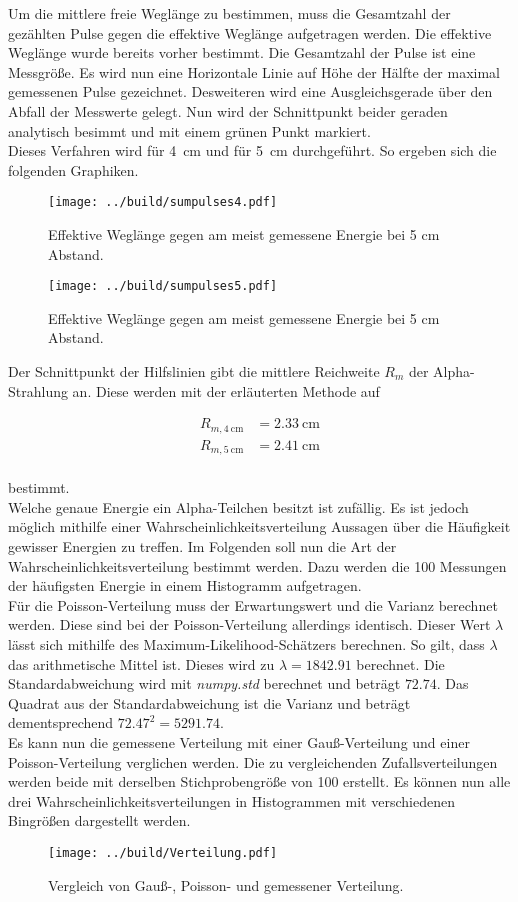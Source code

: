 Um die mittlere freie Weglänge zu bestimmen, muss die Gesamtzahl der gezählten Pulse gegen die effektive Weglänge aufgetragen werden. 
Die effektive Weglänge wurde bereits vorher bestimmt. Die Gesamtzahl der Pulse ist eine Messgröße. 
Es wird nun eine Horizontale Linie auf Höhe der Hälfte der maximal gemessenen Pulse gezeichnet. Desweiteren wird eine Ausgleichsgerade über 
den Abfall der Messwerte gelegt. Nun wird der Schnittpunkt beider geraden analytisch besimmt und mit einem grünen Punkt markiert.\\
\noindent Dieses Verfahren wird für \qty{4}{\centi \meter} und für \qty{5}{\centi \meter} durchgeführt. So ergeben sich die folgenden Graphiken.

\begin{figure}[H] 
    \texttt{[image: ../build/sumpulses4.pdf]}
    \caption{Effektive Weglänge gegen am meist gemessene Energie bei 5 cm Abstand.}
\end{figure}

\begin{figure}[H] 
    \texttt{[image: ../build/sumpulses5.pdf]}
    \caption{Effektive Weglänge gegen am meist gemessene Energie bei 5 cm Abstand.}
\end{figure}

\noindent Der Schnittpunkt der Hilfslinien gibt die mittlere Reichweite $R_m$ der 
Alpha-Strahlung an. Diese werden mit der erläuterten Methode auf 

\begin{align}
    R_{m, \qty{4}{\centi \meter}} &= \qty{2.33}{\centi \meter} \\
    R_{m, \qty{5}{\centi \meter}} &= \qty{2.41}{\centi \meter} \\
\end{align}

\noindent bestimmt.\\

\noindent Welche genaue Energie ein Alpha-Teilchen besitzt ist zufällig. Es ist jedoch möglich mithilfe einer 
Wahrscheinlichkeitsverteilung Aussagen über die Häufigkeit gewisser Energien zu treffen. Im Folgenden soll nun die Art 
der Wahrscheinlichkeitsverteilung bestimmt werden. Dazu werden die 100 Messungen der häufigsten Energie in einem 
Histogramm aufgetragen. \\
\noindent Für die Poisson-Verteilung muss der Erwartungswert und die Varianz berechnet werden. Diese sind bei der 
Poisson-Verteilung allerdings identisch. Dieser Wert $\lambda$ lässt sich mithilfe des Maximum-Likelihood-Schätzers 
berechnen. So gilt, dass $\lambda$ das arithmetische Mittel ist. Dieses wird zu $\lambda = 1842.91$ berechnet.
Die Standardabweichung wird mit \emph{numpy.std} berechnet und beträgt $72.74$. Das Quadrat aus der Standardabweichung ist 
die Varianz und beträgt dementsprechend $72.47^2 = 5291.74$. \\
\noindent Es kann nun die gemessene Verteilung mit einer Gauß-Verteilung und einer Poisson-Verteilung verglichen werden. 
Die zu vergleichenden Zufallsverteilungen werden beide mit derselben Stichprobengröße von 100 erstellt. Es können nun 
alle drei Wahrscheinlichkeitsverteilungen in Histogrammen mit verschiedenen Bingrößen dargestellt werden.

\begin{figure}
    \texttt{[image: ../build/Verteilung.pdf]}
    \caption{Vergleich von Gauß-, Poisson- und gemessener Verteilung.}
\end{figure}




